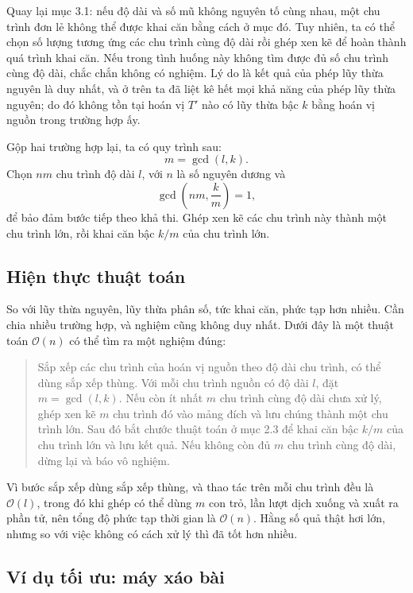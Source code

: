 \documentclass[11pt]{article}
\newcommand{\Oh}{\mathcal{O}}
\begin{document}
Quay lại mục 3.1: nếu độ dài và số mũ không nguyên tố cùng nhau, một chu trình
đơn lẻ không thể được khai căn bằng cách ở mục đó. Tuy nhiên, ta có thể chọn
số lượng tương ứng các chu trình cùng độ dài rồi ghép xen kẽ để hoàn thành quá
trình khai căn. Nếu trong tình huống này không tìm được đủ số chu trình cùng
độ dài, chắc chắn không có nghiệm. Lý do là kết quả của phép lũy thừa nguyên
là duy nhất, và ở trên ta đã liệt kê hết mọi khả năng của phép lũy thừa
nguyên; do đó không tồn tại hoán vị \(T'\) nào có lũy thừa bậc \(k\) bằng
hoán vị nguồn trong trường hợp ấy.

Gộp hai trường hợp lại, ta có quy trình sau:
\[
  m=\gcd(l,k).
\]
Chọn \(n m\) chu trình độ dài \(l\), với \(n\) là số nguyên dương và
\[
  \gcd\left(nm,\frac{k}{m}\right)=1,
\]
để bảo đảm bước tiếp theo khả thi. Ghép xen kẽ các chu trình này thành một
chu trình lớn, rồi khai căn bậc \(k/m\) của chu trình lớn.

\subsection{Hiện thực thuật toán}

So với lũy thừa nguyên, lũy thừa phân số, tức khai căn, phức tạp hơn nhiều.
Cần chia nhiều trường hợp, và nghiệm cũng không duy nhất. Dưới đây là một
thuật toán \(\Oh(n)\) có thể tìm ra một nghiệm đúng:

\begin{quote}
Sắp xếp các chu trình của hoán vị nguồn theo độ dài chu trình, có thể dùng sắp
xếp thùng. Với mỗi chu trình nguồn có độ dài \(l\), đặt \(m=\gcd(l,k)\). Nếu
còn ít nhất \(m\) chu trình cùng độ dài chưa xử lý, ghép xen kẽ \(m\) chu trình
đó vào mảng đích và lưu chúng thành một chu trình lớn. Sau đó bắt chước thuật
toán ở mục 2.3 để khai căn bậc \(k/m\) của chu trình lớn và lưu kết quả. Nếu
không còn đủ \(m\) chu trình cùng độ dài, dừng lại và báo vô nghiệm.
\end{quote}

Vì bước sắp xếp dùng sắp xếp thùng, và thao tác trên mỗi chu trình đều là
\(\Oh(l)\), trong đó khi ghép có thể dùng \(m\) con trỏ, lần lượt dịch xuống
và xuất ra phần tử, nên tổng độ phức tạp thời gian là \(\Oh(n)\). Hằng số quả
thật hơi lớn, nhưng so với việc không có cách xử lý thì đã tốt hơn nhiều.

\subsection{Ví dụ tối ưu: máy xáo bài}
\end{document}
